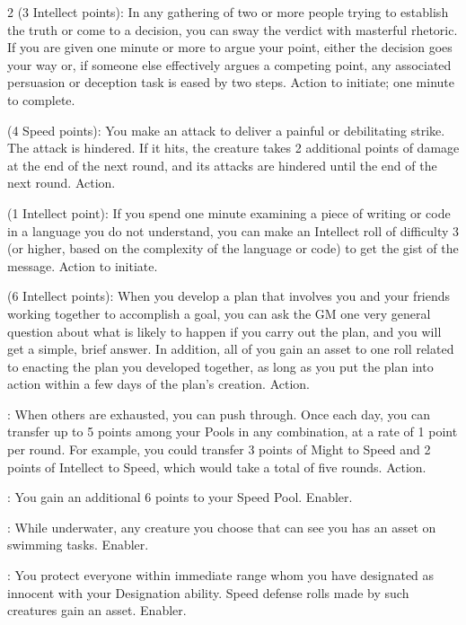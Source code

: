 \begin{multicols}{2}
 (3 Intellect points): In any gathering of two or more people trying to establish the truth or come to a decision, you can sway the verdict with masterful rhetoric. If you are given one minute or more to argue your point, either the decision goes your way or, if someone else effectively argues a competing point, any associated persuasion or deception task is eased by two steps. Action to initiate; one minute to complete. 

 (4 Speed points): You make an attack to deliver a painful or debilitating strike. The attack is hindered. If it hits, the creature takes 2 additional points of damage at the end of the next round, and its attacks are hindered until the end of the next round. Action. 

 (1 Intellect point): If you spend one minute examining a piece of writing or code in a language you do not understand, you can make an Intellect roll of difficulty 3 (or higher, based on the complexity of the language or code) to get the gist of the message. Action to initiate. 

 (6 Intellect points): When you develop a plan that involves you and your friends working together to accomplish a goal, you can ask the GM one very general question about what is likely to happen if you carry out the plan, and you will get a simple, brief answer. In addition, all of you gain an asset to one roll related to enacting the plan you developed together, as long as you put the plan into action within a few days of the plan’s creation. Action. 

: When others are exhausted, you can push through. Once each day, you can transfer up to 5 points among your Pools in any combination, at a rate of 1 point per round. For example, you could transfer 3 points of Might to Speed and 2 points of Intellect to Speed, which would take a total of five rounds. Action. 

: You gain an additional 6 points to your Speed Pool. Enabler. 

: While underwater, any creature you choose that can see you has an asset on swimming tasks. Enabler. 

: You protect everyone within immediate range whom you have designated as innocent with your Designation ability. Speed defense rolls made by such creatures gain an asset. Enabler. 


\end{multicols}
